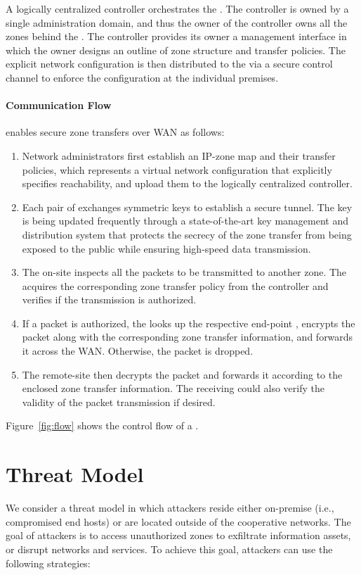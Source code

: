 A logically centralized controller orchestrates the \tps. The controller is owned
by a single administration domain, and thus the owner of the controller owns all
the zones behind the \tps. The controller provides its owner a management interface
in which the owner designs an outline of zone structure and transfer policies. The
explicit network configuration is then distributed to the \tps via a secure control
channel to enforce the configuration at the individual premises.

\paragraph{Communication Flow}

\name enables secure zone transfers over WAN as follows:

\begin{enumerate}
	\item Network administrators first establish an IP-zone map and their transfer
	      policies, which represents a virtual network configuration that explicitly
	      specifies reachability, and upload them to the logically centralized
	      controller.
	\item Each pair of \tps exchanges symmetric keys to establish a secure tunnel.
	      The key is being updated frequently through a state-of-the-art key management and
	      distribution system that protects the secrecy of the zone transfer from
	      being exposed to the public while ensuring high-speed data transmission.
	\item The on-site \tp inspects all the packets to be transmitted to another zone.
	      The \tp acquires the corresponding zone transfer policy from the controller
	      and verifies if the transmission is authorized.
	\item If a packet is authorized, the \tp looks up the respective end-point \tp,
	      encrypts the packet along with the corresponding zone transfer information,
	      and forwards it across the WAN. Otherwise, the packet is dropped.
	\item The remote-site \tp then decrypts the packet and forwards it according to
	      the enclosed zone transfer information. The receiving \tp could also verify
	      the validity of the packet transmission if desired.
\end{enumerate}

Figure~\ref{fig:flow} shows the control flow of a \tp.

\section{Threat Model}
\label{sec:threatmodel}
We consider a threat model in which attackers reside either on-premise (i.e., compromised
end hosts) or are located
outside of the cooperative networks. The goal of attackers is to access unauthorized zones
to exfiltrate information assets, or disrupt networks and services. To achieve this goal,
attackers can use the following strategies:

